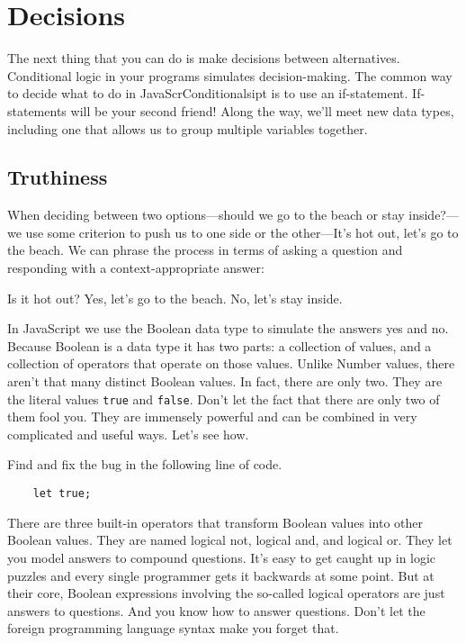 \chapter[Second Friend: Decisions]{Decisions}

The next thing that you can do is make decisions between alternatives.
Conditional logic in your programs simulates decision-making. The common way to
decide what to do in JavaScrConditionalsipt is to use an if-statement.
If-statements will be your second friend! Along the way, we'll meet new data
types, including one that allows us to group multiple variables together.

\section{Truthiness}
When deciding between two options---should we go to the beach or stay
inside?---we use some criterion to push us to one side or the other---It's hot
out, let's go to the beach. We can phrase the process in terms of asking a
question and responding with a context-appropriate answer:

Is it hot out?
Yes, let's go to the beach.
No, let's stay inside.

In JavaScript we use the \textsf{Boolean} data type to simulate the answers yes
and no. Because \textsf{Boolean} is a data type it has two parts: a collection
of values, and a collection of operators that operate on those values. Unlike
\textsf{Number} values, there aren't that many distinct \textsf{Boolean} values.
In fact, there are only two. They are the literal values \texttt{true} and
\texttt{false}. Don't let the fact that there are only two of them fool you.
They are immensely powerful and can be combined in very complicated and useful
ways. Let's see how.

\begin{question}
  Find and fix the bug in the following line of code.
  \begin{lstlisting}
    let true;
  \end{lstlisting}
\end{question}

There are three built-in operators that transform \textsf{Boolean} values into
other \textsf{Boolean} values. They are named logical \textsf{not}, logical
\textsf{and}, and logical \textsf{or}. They let you model answers to compound
questions. It's easy to get caught up in logic puzzles and every single
programmer gets it backwards at some point. But at their core, \textsf{Boolean}
expressions involving the so-called logical operators are just answers to
questions. And you know how to answer questions. Don't let the foreign
programming language syntax make you forget that.

